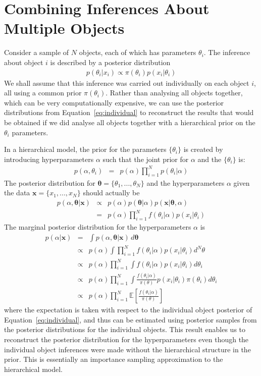 \documentclass[useAMS,usenatbib]{mn2e}
\renewcommand{\btheta}{\boldsymbol{\theta}}
\newcommand{\bx}{\boldsymbol{x}}
\begin{document}
\section{Combining Inferences About Multiple Objects}
Consider a sample of $N$ objects, each of which has parameters $\theta_i$.
The inference about object $i$ is described by a posterior distribution
\begin{eqnarray}
p(\theta_i | x_i) \propto \pi(\theta_i)p(x_i | \theta_i)\label{eq:individual}
\end{eqnarray}
We shall assume that this inference was carried out individually
on each object $i$, all using a common prior $\pi(\theta_i)$. Rather than
analysing all objects together, which can be very computationally expensive,
we can use the posterior distributions from Equation~\ref{eq:individual}
to reconstruct the results that would be obtained if we did analyse all
objects together with a hierarchical prior on the $\theta_i$ parameters.

In a hierarchical model, the prior for the parameters $\{\theta_i\}$ is created
by introducing hyperparameters $\alpha$ such that the joint prior for $\alpha$
and the $\{\theta_i\}$ is:
\begin{eqnarray}
p(\alpha, \theta_i) &=& p(\alpha)\prod_{i=1}^N p(\theta_i | \alpha)
\end{eqnarray}
The posterior distribution for
$\btheta = \{\theta_1, ..., \theta_N\}$ and the hyperparameters $\alpha$
given the data 
$\bx = \{x_1, ..., x_N\}$
should actually be
\begin{eqnarray}
p(\alpha, \btheta | \bx) &\propto&
p(\alpha)p(\btheta|\alpha)p(\bx | \btheta, \alpha)\\
&=& p(\alpha)\prod_{i=1}^N f(\theta_i|\alpha)p(x_i | \theta_i)
\end{eqnarray}
The marginal posterior distribution for the hyperparameters $\alpha$ is
\begin{eqnarray}
p(\alpha | \bx) &=&
\int p(\alpha, \btheta|\bx) \, d\btheta\\
&\propto& p(\alpha)\int \prod_{i=1}^N f(\theta_i|\alpha)p(x_i | \theta_i) d^N\theta\\
&\propto& p(\alpha) \prod_{i=1}^N \int f(\theta_i|\alpha)p(x_i | \theta_i) d\theta_i\\
&\propto& p(\alpha) \prod_{i=1}^N \int \frac{f(\theta_i|\alpha)}{\pi(\theta)}p(x_i | \theta_i) \pi(\theta_i)d\theta_i\\
&\propto& p(\alpha) \prod_{i=1}^N \mathds{E}\left[\frac{f(\theta_i|\alpha)}{\pi(\theta)}\right]
\end{eqnarray}
where the expectation is taken with respect to the individual object posterior
of Equation~\ref{eq:individual}, and thus can be estimated using posterior
samples from the posterior distributions for the individual objects.
This result enables us to reconstruct the
posterior distribution for the hyperparameters even though the individual object
inferences were made without the hierarchical structure in the prior. This is
essentially an importance sampling approximation to the hierarchical model.
\end{document}
